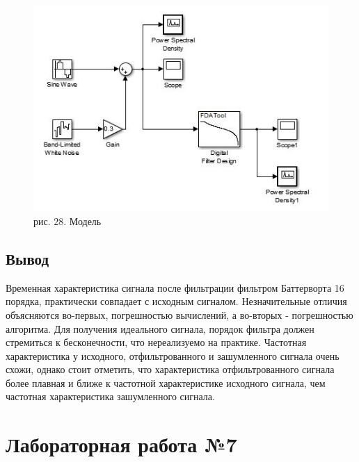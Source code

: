 \documentclass[10pt,a4paper]{report}
\begin{document}
\begin{figure}
\begin{center}
\includegraphics[width=150mm, scale = 0.9]{6_9.jpg}\newline
рис. 28. Модель\newline
\end{center}
\end{figure}
\section{Вывод}
Временная характеристика сигнала после фильтрации фильтром Баттерворта 16 порядка, практически совпадает с исходным сигналом. Незначительные отличия объясняются во-первых, погрешностью вычислений, а во-вторых - погрешностью алгоритма. Для получения идеального сигнала, порядок фильтра должен стремиться к бесконечности, что нереализуемо на практике. Частотная характеристика у исходного, отфильтрованного и зашумленного сигнала очень схожи, однако стоит отметить, что характеристика отфильтрованного сигнала более плавная и ближе к частотной характеристике исходного сигнала, чем частотная характеристика зашумленного сигнала.
\chapter{Лабораторная работа №7}
\end{document}
